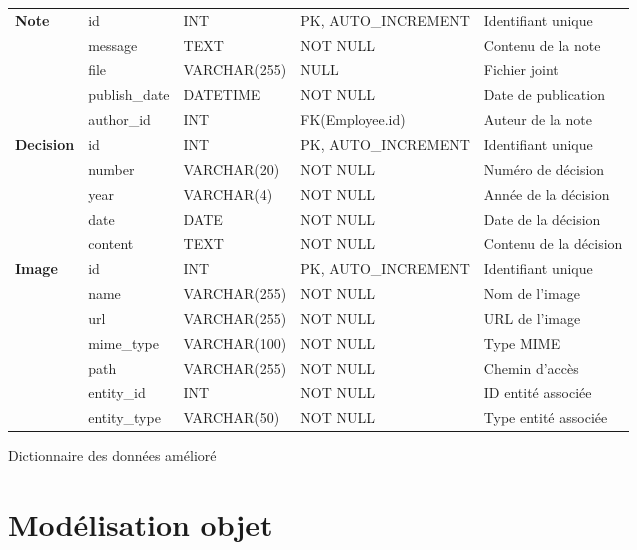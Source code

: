 \begin{longtable}{|p{2.5cm}|p{3cm}|p{3cm}|p{3cm}|p{3cm}|}
    \multirow{4}{*}{\textbf{Note}} & id & INT & PK, AUTO\_INCREMENT & Identifiant unique \\
    \cline{2-5}
    & message & TEXT & NOT NULL & Contenu de la note \\
    \cline{2-5}
    & file & VARCHAR(255) & NULL & Fichier joint \\
    \cline{2-5}
    & publish\_date & DATETIME & NOT NULL & Date de publication \\
    \cline{2-5}
    & author\_id & INT & FK(Employee.id) & Auteur de la note \\
    \hline

    \multirow{5}{*}{\textbf{Decision}} & id & INT & PK, AUTO\_INCREMENT & Identifiant unique \\
    \cline{2-5}
    & number & VARCHAR(20) & NOT NULL & Numéro de décision \\
    \cline{2-5}
    & year & VARCHAR(4) & NOT NULL & Année de la décision \\
    \cline{2-5}
    & date & DATE & NOT NULL & Date de la décision \\
    \cline{2-5}
    & content & TEXT & NOT NULL & Contenu de la décision \\
    \hline

    \multirow{6}{*}{\textbf{Image}} & id & INT & PK, AUTO\_INCREMENT & Identifiant unique \\
    \cline{2-5}
    & name & VARCHAR(255) & NOT NULL & Nom de l'image \\
    \cline{2-5}
    & url & VARCHAR(255) & NOT NULL & URL de l'image \\
    \cline{2-5}
    & mime\_type & VARCHAR(100) & NOT NULL & Type MIME \\
    \cline{2-5}
    & path & VARCHAR(255) & NOT NULL & Chemin d'accès \\
    \cline{2-5}
    & entity\_id & INT & NOT NULL & ID entité associée \\
    \cline{2-5}
    & entity\_type & VARCHAR(50) & NOT NULL & Type entité associée \\
    \hline
\end{longtable}
\begin{table}[H]
    \centering
    \caption{Dictionnaire des données amélioré}
    \label{tab:table_dictionnaire_data_ameliore}
\end{table}

\section{Modélisation objet}

